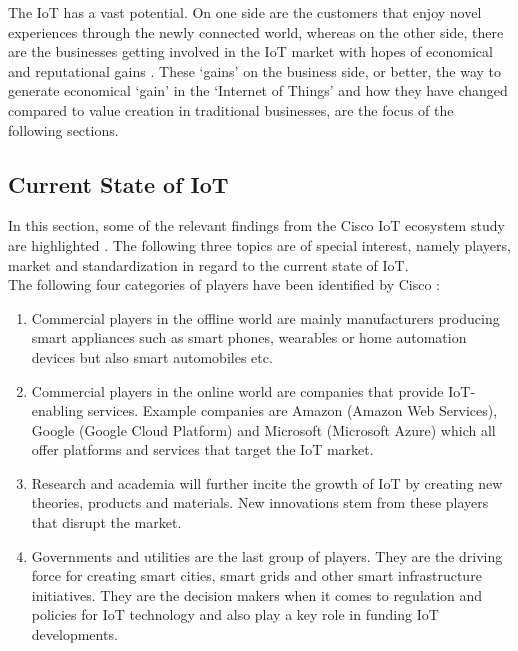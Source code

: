 	The IoT has a vast potential. On one side are the customers that enjoy novel experiences through the newly connected world, whereas on the other side, there are the businesses getting involved in the IoT market with hopes of economical and reputational gains \cite{ju}. These `gains' on the business side, or better, the way to generate economical `gain' in the `Internet of Things' and how they have changed compared to value creation in traditional businesses, are the focus of the following sections.
	\vspace{-1em}
	\subsection{Current State of IoT}
	\vspace{-1em}
		In this section, some of the relevant findings from the Cisco IoT ecosystem study are highlighted \cite{cisco}. The following three topics are of special interest, namely players, market and standardization in regard to the current state of IoT.\\
		The following four categories of players have been identified by Cisco \cite{cisco}:
		\vspace{-1em}
		\begin{enumerate}
			\item Commercial players in the offline world are mainly manufacturers producing smart appliances such as smart phones, wearables or home automation devices but also smart automobiles etc.

			\item Commercial players in the online world are companies that provide IoT-enabling services. Example companies are Amazon (Amazon Web Services), Google (Google Cloud Platform) and Microsoft (Microsoft Azure) which all offer platforms and services that target the IoT market.

			\item Research and academia will further incite the growth of IoT by creating new theories, products and materials. New innovations stem from these players that disrupt the market.

			\item Governments and utilities are the last group of players. They are the driving force for creating smart cities, smart grids and other smart infrastructure initiatives. They are the decision makers when it comes to regulation and policies for IoT technology and also play a key role in funding IoT developments.
		\end{enumerate}
